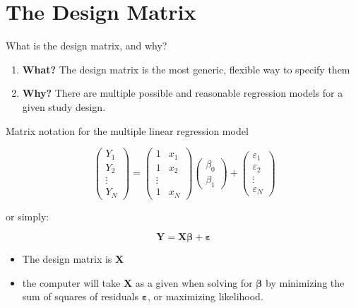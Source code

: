 \documentclass[
  ignorenonframetext,
]{beamer}
\providecommand{\tightlist}{%
  \setlength{\itemsep}{0pt}\setlength{\parskip}{0pt}}
\begin{document}
\hypertarget{the-design-matrix}{%
\section{The Design Matrix}\label{the-design-matrix}}

\begin{frame}{What is the design matrix, and why?}
\protect\hypertarget{what-is-the-design-matrix-and-why}{}

\begin{enumerate}
\tightlist
\item
  \textbf{What?} The design matrix is the most generic, flexible way to
  specify them
\item
  \textbf{Why?} There are multiple possible and reasonable regression
  models for a given study design.
\end{enumerate}

\end{frame}

\begin{frame}{Matrix notation for the multiple linear regression model}
\protect\hypertarget{matrix-notation-for-the-multiple-linear-regression-model}{}

\[
\,
\begin{pmatrix}
Y_1\\
Y_2\\
\vdots\\
Y_N
\end{pmatrix} = 
\begin{pmatrix}
1&x_1\\
1&x_2\\
\vdots\\
1&x_N
\end{pmatrix}
\begin{pmatrix}
\beta_0\\
\beta_1
\end{pmatrix} +
\begin{pmatrix}
\varepsilon_1\\
\varepsilon_2\\
\vdots\\
\varepsilon_N
\end{pmatrix}
\]

or simply:

\[
\mathbf{Y}=\mathbf{X}\boldsymbol{\beta}+\boldsymbol{\varepsilon}
\]

\begin{itemize}
\tightlist
\item
  The design matrix is \(\mathbf{X}\)
\item
  the computer will take \(\mathbf{X}\) as a given when solving for
  \(\boldsymbol{\beta}\) by minimizing the sum of squares of residuals
  \(\boldsymbol{\varepsilon}\), or maximizing likelihood.
\end{itemize}

\end{frame}
\end{document}
